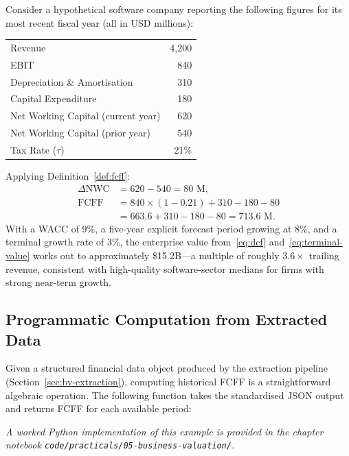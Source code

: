 \begin{deepdive}
\begin{example}
\label{ex:fcff-example}
Consider a hypothetical software company reporting the following figures for its most
recent fiscal year (all in USD millions):
\begin{center}
\begin{tabular}{lr}
\hline
Revenue & 4{,}200 \\
EBIT & 840 \\
Depreciation \& Amortisation & 310 \\
Capital Expenditure & 180 \\
Net Working Capital (current year) & 620 \\
Net Working Capital (prior year) & 540 \\
Tax Rate ($\tau$) & 21\% \\
\hline
\end{tabular}
\end{center}
Applying Definition~\ref{def:fcff}:
\begin{align*}
\Delta\mathrm{NWC} &= 620 - 540 = 80\text{ M},\\
\mathrm{FCFF} &= 840 \times (1 - 0.21) + 310 - 180 - 80\\
              &= 663.6 + 310 - 180 - 80 = 713.6\text{ M}.
\end{align*}
With a WACC of 9\%, a five-year explicit forecast period growing at 8\%, and a terminal
growth rate of 3\%, the enterprise value from~\eqref{eq:dcf}
and~\eqref{eq:terminal-value} works out to approximately \$15.2B---a multiple of
roughly $3.6\times$ trailing revenue, consistent with high-quality software-sector
medians for firms with strong near-term growth.
\end{example}

\subsection{Programmatic Computation from Extracted Data}
\label{subsec:bv-cashflows-computation}

Given a structured financial data object produced by the extraction pipeline
(Section~\ref{sec:bv-extraction}), computing historical FCFF is a straightforward
algebraic operation. The following function takes the standardised JSON output
and returns FCFF for each available period:

\textit{A worked Python implementation of this example is provided in the chapter notebook \texttt{code/practicals/05-business-valuation/}.}


\end{deepdive}
